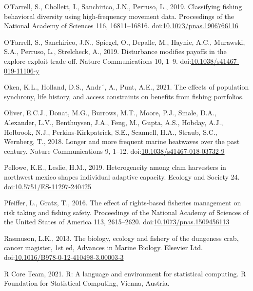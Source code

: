 \documentclass[]{elsarticle} %
\begin{document}
\leavevmode\hypertarget{ref-OFarrell2019}{}%
O'Farrell, S., Chollett, I., Sanchirico, J.N., Perruso, L., 2019.
Classifying fishing behavioral diversity using high-frequency movement
data. Proceedings of the National Academy of Sciences 116, 16811--16816.
doi:\href{https://doi.org/10.1073/pnas.1906766116}{10.1073/pnas.1906766116}

\leavevmode\hypertarget{ref-OFarrell2019a}{}%
O'Farrell, S., Sanchirico, J.N., Spiegel, O., Depalle, M., Haynie, A.C.,
Murawski, S.A., Perruso, L., Strelcheck, A., 2019. Disturbance modifies
payoffs in the explore-exploit trade-off. Nature Communications 10,
1--9.
doi:\href{https://doi.org/10.1038/s41467-019-11106-y}{10.1038/s41467-019-11106-y}

\leavevmode\hypertarget{ref-Oken2021}{}%
Oken, K.L., Holland, D.S., Andr´, A., Punt, A.E., 2021. The effects of
population synchrony, life history, and access constraints on benefits
from fishing portfolios.

\leavevmode\hypertarget{ref-Oliver2018}{}%
Oliver, E.C.J., Donat, M.G., Burrows, M.T., Moore, P.J., Smale, D.A.,
Alexander, L.V., Benthuysen, J.A., Feng, M., Gupta, A.S., Hobday, A.J.,
Holbrook, N.J., Perkins-Kirkpatrick, S.E., Scannell, H.A., Straub, S.C.,
Wernberg, T., 2018. Longer and more frequent marine heatwaves over the
past century. Nature Communications 9, 1--12.
doi:\href{https://doi.org/10.1038/s41467-018-03732-9}{10.1038/s41467-018-03732-9}

\leavevmode\hypertarget{ref-Pellowe2019}{}%
Pellowe, K.E., Leslie, H.M., 2019. Heterogeneity among clam harvesters
in northwest mexico shapes individual adaptive capacity. Ecology and
Society 24.
doi:\href{https://doi.org/10.5751/ES-11297-240425}{10.5751/ES-11297-240425}

\leavevmode\hypertarget{ref-Pfeiffer2016}{}%
Pfeiffer, L., Gratz, T., 2016. The effect of rights-based fisheries
management on risk taking and fishing safety. Proceedings of the
National Academy of Sciences of the United States of America 113,
2615--2620.
doi:\href{https://doi.org/10.1073/pnas.1509456113}{10.1073/pnas.1509456113}

\leavevmode\hypertarget{ref-Rasmuson2013}{}%
Rasmuson, L.K., 2013. The biology, ecology and fishery of the dungeness
crab, cancer magister, 1st ed, Advances in Marine Biology. Elsevier Ltd.
doi:\href{https://doi.org/10.1016/B978-0-12-410498-3.00003-3}{10.1016/B978-0-12-410498-3.00003-3}

\leavevmode\hypertarget{ref-RCoreTeam2021}{}%
R Core Team, 2021. R: A language and environment for statistical
computing. R Foundation for Statistical Computing, Vienna, Austria.
\end{document}

